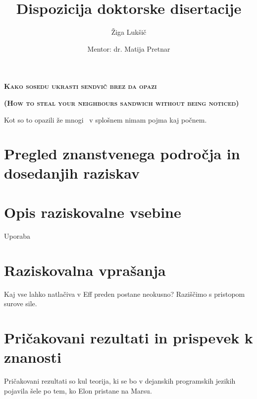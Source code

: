 \documentclass{article}
\title{Dispozicija doktorske disertacije}
\author{Žiga Lukšič \and Mentor: dr. Matija Pretnar}
\date{}
\begin{document}
\maketitle

\vspace{-10mm}
\begin{center}
  \Large{\textsc{\textbf{Kako sosedu ukrasti sendvič brez da opazi}}}

  \Large{\textsc{\textbf{(How to steal your neighbours sandwich without being noticed)}}}
\end{center}

Kot so to opazili že mnogi~\cite{DBLP:conf/icfp/KammarLO13,DBLP:journals/entcs/Pretnar15,DBLP:journals/pacmpl/Ahman18} v splošnem nimam pojma kaj počnem.


\section*{Pregled znanstvenega področja in dosedanjih raziskav}



\section*{Opis raziskovalne vsebine}

Uporaba

\section*{Raziskovalna vprašanja}

Kaj vse lahko natlačiva v Eff preden postane neokusno? Raziščimo s pristopom surove sile.

\section*{Pričakovani rezultati in prispevek k znanosti}

Pričakovani rezultati so kul teorija, ki se bo v dejanskih programskih jezikih pojavila šele po tem, ko Elon pristane na Marsu.

\renewcommand\refname{Literatura}


\end{document}

